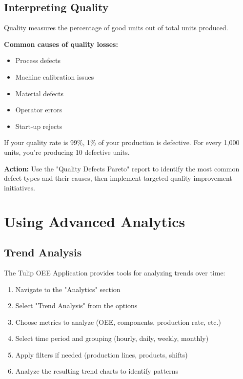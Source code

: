 \documentclass[12pt,a4paper]{report}
\begin{document}
\subsection{Interpreting Quality}

Quality measures the percentage of good units out of total units produced.

\textbf{Common causes of quality losses:}
\begin{itemize}
    \item Process defects
    \item Machine calibration issues
    \item Material defects
    \item Operator errors
    \item Start-up rejects
\end{itemize}

\begin{tcolorbox}[colback=tuliplightgray,colframe=tulipblue,title=Example Analysis]
If your quality rate is 99\%, 1\% of your production is defective. For every 1,000 units, you're producing 10 defective units.

\textbf{Action:} Use the "Quality Defects Pareto" report to identify the most common defect types and their causes, then implement targeted quality improvement initiatives.
\end{tcolorbox}

\section{Using Advanced Analytics}

\subsection{Trend Analysis}

The Tulip OEE Application provides tools for analyzing trends over time:

\begin{enumerate}
    \item Navigate to the "Analytics" section
    \item Select "Trend Analysis" from the options
    \item Choose metrics to analyze (OEE, components, production rate, etc.)
    \item Select time period and grouping (hourly, daily, weekly, monthly)
    \item Apply filters if needed (production lines, products, shifts)
    \item Analyze the resulting trend charts to identify patterns
\end{enumerate}
\end{document}
